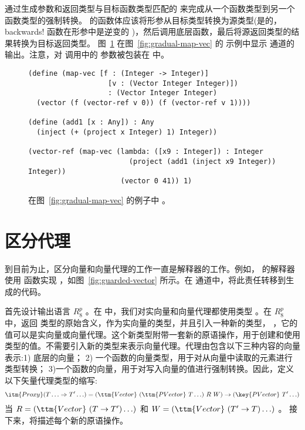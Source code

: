 \documentclass[11pt]{book}
\begin{document}
通过生成参数和返回类型与目标函数类型匹配的  来完成从一个函数类型到另一个函数类型的强制转换。  的函数体应该将形参从目标类型转换为源类型(是的，
backwards! 函数在形参中是逆变的 )，然后调用底层函数，最后将源返回类型的结果转换为目标返回类型。
图~\ref{fig:map-vec-lower-cast} 在图~\ref{fig:gradual-map-vec} 的  示例中显示
 通道的输出。注意，对  调用中的  参数被包装在  中。

\begin{figure}[tbp]
\begin{lstlisting}
(define (map-vec [f : (Integer -> Integer)]
                   [v : (Vector Integer Integer)])
                   : (Vector Integer Integer)
  (vector (f (vector-ref v 0)) (f (vector-ref v 1))))

(define (add1 [x : Any]) : Any
  (inject (+ (project x Integer) 1) Integer))

(vector-ref (map-vec (lambda: ([x9 : Integer]) : Integer
                        (project (add1 (inject x9 Integer)) Integer))
                      (vector 0 41)) 1)
\end{lstlisting}
\caption{在图~\ref{fig:gradual-map-vec} 的例子中  。}
\label{fig:map-vec-lower-cast}
\end{figure}


\section{区分代理}
\label{sec:differentiate-proxies}

到目前为止，区分向量和向量代理的工作一直是解释器的工作。例如， \LangCast{}
的解释器使用  函数实现  
，如图~\ref{fig:guarded-vector} 所示。在
 通道中，将此责任转移到生成的代码。

首先设计输出语言 $R^p_8$ 。在
\LangGrad{} 中，我们对实向量和向量代理都使用类型  。在 $R^p_8$ 中，返回  类型的原始含义，作为实向量的类型，并且引入一种新的类型，  ，它的值可以是实向量或向量代理。这个新类型附带一套新的原语操作，用于创建和使用  类型的值。不需要引入新的类型来表示向量代理。代理由包含以下三种内容的向量表示:1) 底层的向量； 2) 一个函数的向量类型，用于对从向量中读取的元素进行类型转换； 3)一个函数的向量，用于对写入向量的值进行强制转换。因此，定义以下矢量代理类型的缩写:
\[
\itm{Proxy} (T\ldots \Rightarrow T'\ldots)
= (\ttm{Vector}~(\ttm{PVector}~ T\ldots) ~R~ W)
  \to (\key{PVector}~ T' \ldots)
\]
当 $R = (\ttm{Vector}~(T\to T') \ldots)$ 和
$W = (\ttm{Vector}~(T'\to T) \ldots)$ 。
%
接下来，将描述每个新的原语操作。
\end{document}
